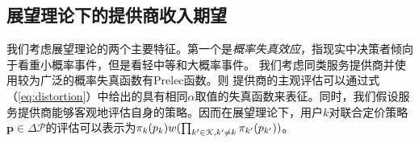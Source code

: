 \subsection{展望理论下的提供商收入期望}

我们考虑展望理论的两个主要特征。第一个是\emph{概率失真效应}，指现实中决策者倾向于看重小概率事件，但是看轻中等和大概率事件。
我们考虑同类服务提供商并使用较为广泛的概率失真函数有Prelec函数\cite{Prelec}。则
提供商的主观评估可以通过式（\ref{eq:distortion}）中给出的具有相同$\alpha$取值的失真函数来表征。同时，我们假设服务提供商能够客观地评估自身的策略。因而在展望理论下，用户$k$对联合定价策略$\mathbf{p}\in\Delta\mathcal{P}$的评估可以表示为$\pi_k(p_k)w(\prod_{k'\in\mathcal{K},k'\neq k}\pi_{k'}(p_{k'}))$。

